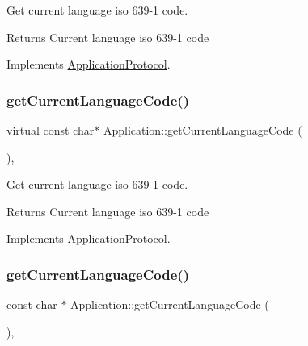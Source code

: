 Get current language iso 639-\/1 code. 

\begin{DoxyReturn}{Returns}
Current language iso 639-\/1 code 
\end{DoxyReturn}


Implements \hyperlink{classApplicationProtocol_a4cb7a696dd51fee3ebb3075f0cca1455}{Application\+Protocol}.

\mbox{\label{classApplication_a47bfc4cd5a784ce46bd05e727b2e8781}} 
\subsubsection{\texorpdfstring{get\+Current\+Language\+Code()}{getCurrentLanguageCode()}\hspace{0.1cm}{\footnotesize\ttfamily [5/12]}}
{\footnotesize\ttfamily virtual const char$\ast$ Application\+::get\+Current\+Language\+Code (\begin{DoxyParamCaption}{ }\end{DoxyParamCaption})\hspace{0.3cm}{\ttfamily [override]}, {\ttfamily [virtual]}}



Get current language iso 639-\/1 code. 

\begin{DoxyReturn}{Returns}
Current language iso 639-\/1 code 
\end{DoxyReturn}


Implements \hyperlink{classApplicationProtocol_a4cb7a696dd51fee3ebb3075f0cca1455}{Application\+Protocol}.

\mbox{\label{classApplication_a8b381edef7fa6ce48092073c6d843c4b}} 
\subsubsection{\texorpdfstring{get\+Current\+Language\+Code()}{getCurrentLanguageCode()}\hspace{0.1cm}{\footnotesize\ttfamily [6/12]}}
{\footnotesize\ttfamily const char $\ast$ Application\+::get\+Current\+Language\+Code (\begin{DoxyParamCaption}{ }\end{DoxyParamCaption})\hspace{0.3cm}{\ttfamily [override]}, {\ttfamily [virtual]}}



